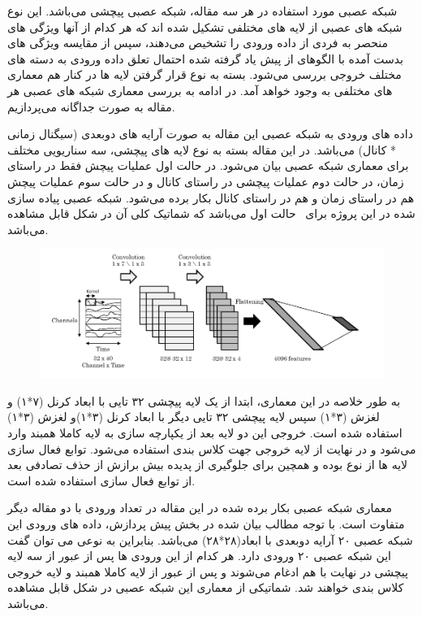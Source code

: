 شبکه عصبی مورد استفاده در هر سه مقاله، شبکه عصبی پیچشی  می‌باشد. این نوع شبکه های عصبی از لایه های مختلفی تشکیل شده اند که هر کدام از آنها ویژگی های منحصر به فردی از داده ورودی را تشخیص می‌دهند، سپس از مقایسه ویژگی های بدست آمده با الگوهای از پیش یاد گرفته شده احتمال تعلق داده ورودی به دسته های مختلف خروجی بررسی می‌شود. بسته به نوع قرار گرفتن لایه ها در کنار هم معماری های مختلفی به وجود خواهد آمد. در ادامه به بررسی معماری شبکه های عصبی هر مقاله به صورت جداگانه می‌پردازیم.

داده های ورودی به شبکه عصبی این مقاله به صورت آرایه های دوبعدی (سیگنال زمانی * کانال) می‌باشد. در این مقاله بسته به نوع لایه های پیچشی، سه سناریویی مختلف برای معماری شبکه عصبی بیان می‌شود. در حالت اول عملیات پیچش فقط در راستای زمان، در حالت دوم عملیات پیچشی در راستای کانال و در حالت سوم  عملیات پیچش هم در راستای زمان و هم در راستای کانال بکار برده می‌شود. شبکه عصبی پیاده سازی شده در این پروژه برای \آ\ حالت اول می‌باشد که شماتیک کلی آن در شکل  قابل مشاهده می‌باشد.

\begin{figure}
\centering
\includegraphics[width=15cm]{img/cnn1.png}
\end{figure}

به طور خلاصه در این معماری،‌ ابتدا از یک لایه پیچشی ۳۲ تایی با ابعاد کرنل (۷*۱) و لغزش (۳*۱) سپس لایه پیچشی ۳۲ تایی دیگر با ابعاد کرنل (۳*۱)و لغزش (۳*۱) استفاده شده است. خروجی این دو لایه بعد از یکپارچه سازی به لایه کاملا همبند وارد می‌شود و در نهایت از لایه خروجی  جهت کلاس بندی استفاده می‌شود. توابع فعال سازی لایه ها از نوع  بوده و همچین برای جلوگیری از پدیده بیش برازش از حذف تصادفی  بعد از توابع فعال سازی استفاده شده است. 

معماری شبکه عصبی بکار برده شده در این مقاله در تعداد ورودی با دو مقاله دیگر متفاوت است. با توجه مطالب بیان شده در بخش پیش پردازش، داده های ورودی این شبکه عصبی ۲۰ آرایه دوبعدی با ابعاد(۲۸*۲۸) می‌باشد.  بنابراین به نوعی می توان گفت  این شبکه عصبی ۲۰ ورودی دارد. هر کدام از این ورودی ها پس از عبور از سه لایه پیچشی در نهایت با هم ادغام می‌شوند و  پس از عبور از لایه کاملا همبند و لایه خروجی کلاس بندی خواهند شد. شماتیکی از معماری این شبکه عصبی در شکل  قابل مشاهده می‌باشد. 

